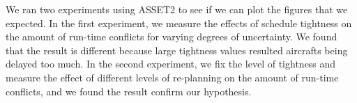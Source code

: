 \documentclass{article}
\begin{document}
We ran two experiments using ASSET2 to see if we can plot the figures that we expected. In the first experiment, we measure the effects of schedule tightness on the amount of run-time conflicts for varying degrees of uncertainty. We found that the result is different because large tightness values resulted aircrafts being delayed too much. In the second experiment, we fix the level of tightness and measure the effect of different levels of re-planning on the amount of run-time conflicts, and we found the result confirm our hypothesis.

\end{document}
